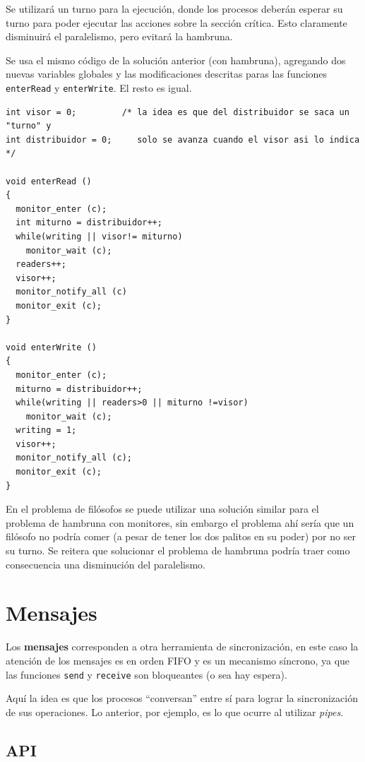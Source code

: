 Se utilizará un turno para la ejecución, donde los procesos deberán esperar su
turno para poder ejecutar las acciones sobre la sección crítica. Esto claramente
disminuirá el paralelismo, pero evitará la hambruna.

Se usa el mismo código de la solución anterior (con hambruna), agregando dos
nuevas variables globales y las modificaciones descritas paras las funciones
\texttt{enterRead} y \texttt{enterWrite}. El resto es igual.

\begin{lstlisting}
int visor = 0;         /* la idea es que del distribuidor se saca un "turno" y
int distribuidor = 0;     solo se avanza cuando el visor asi lo indica */

void enterRead ()
{
  monitor_enter (c);
  int miturno = distribuidor++;
  while(writing || visor!= miturno)
    monitor_wait (c);
  readers++;
  visor++;
  monitor_notify_all (c)
  monitor_exit (c);
}

void enterWrite ()
{
  monitor_enter (c);
  miturno = distribuidor++;
  while(writing || readers>0 || miturno !=visor)
    monitor_wait (c);
  writing = 1;
  visor++;
  monitor_notify_all (c);
  monitor_exit (c);
}
\end{lstlisting}

En el problema de filósofos se puede utilizar una solución similar para el
problema de hambruna con monitores, sin embargo el problema ahí sería que un
filósofo no podría comer (a pesar de tener los dos palitos en su poder) por no
ser su turno. Se reitera que solucionar el problema de hambruna podría traer
como consecuencia una disminución del paralelismo.

\section{Mensajes}
Los \textbf{mensajes} corresponden a otra herramienta de sincronización, en este
caso la atención de los mensajes es en orden FIFO y es un mecanismo síncrono, ya
que las funciones \texttt{send} y \texttt{receive} son bloqueantes (o sea hay
espera).

Aquí la idea es que los procesos ``conversan'' entre sí para lograr la
sincronización de sus operaciones. Lo anterior, por ejemplo, es lo que ocurre al
utilizar \emph{pipes}.

\subsection{API}

